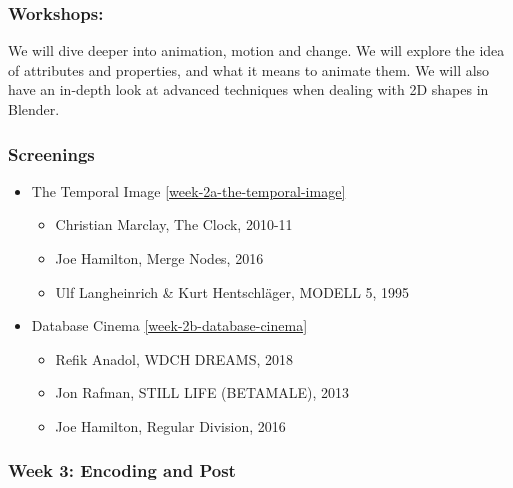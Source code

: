 \documentclass[10pt,letter,english]{article}
\begin{document}
\hypertarget{workshops-1}{%
      \subsubsection*{Workshops:}\label{workshops-1}}
We will dive deeper into animation, motion and change. We will explore the idea of attributes and properties, and what it means to animate them. We will also have an in-depth look at advanced techniques when dealing with 2D shapes in Blender.

\hypertarget{screenings-1}{%
      \subsubsection*{Screenings}\label{screenings-1}}

\begin{itemize}
      \item
            The Temporal Image \ref{week-2a-the-temporal-image}

            \begin{itemize}
                  \item
                        Christian Marclay, The Clock, 2010-11
                  \item
                        Joe Hamilton, Merge Nodes, 2016
                  \item
                        Ulf Langheinrich \& Kurt Hentschläger, MODELL 5, 1995
            \end{itemize}
      \item
            Database Cinema \ref{week-2b-database-cinema}

            \begin{itemize}
                  \item
                        Refik Anadol, WDCH DREAMS, 2018
                  \item
                        Jon Rafman, STILL LIFE (BETAMALE), 2013
                  \item
                        Joe Hamilton, Regular Division, 2016
            \end{itemize}
\end{itemize}

\clearpage
\hypertarget{week-3-encoding-and-post}{%
      \subsubsection{Week 3: Encoding and Post}\label{week-3-encoding-and-post}}
\end{document}
